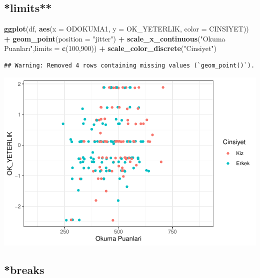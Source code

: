 \documentclass[
  oneside]{book}
\newenvironment{Shaded}{\begin{snugshade}}{\end{snugshade}}
\newcommand{\AttributeTok}[1]{\textcolor[rgb]{0.13,0.29,0.53}{#1}}
\newcommand{\DecValTok}[1]{\textcolor[rgb]{0.00,0.00,0.81}{#1}}
\newcommand{\FunctionTok}[1]{\textcolor[rgb]{0.13,0.29,0.53}{\textbf{#1}}}
\newcommand{\NormalTok}[1]{#1}
\newcommand{\SpecialCharTok}[1]{\textcolor[rgb]{0.81,0.36,0.00}{\textbf{#1}}}
\newcommand{\StringTok}[1]{\textcolor[rgb]{0.31,0.60,0.02}{#1}}
\begin{document}
\hypertarget{limits}{%
\subsection{*limits**}\label{limits}}

\begin{Shaded}
\begin{Highlighting}[]
\FunctionTok{ggplot}\NormalTok{(df, }\FunctionTok{aes}\NormalTok{(}\AttributeTok{x =}\NormalTok{ ODOKUMA1,}
\AttributeTok{y =}\NormalTok{ OK\_YETERLIK,}
\AttributeTok{color =}\NormalTok{ CINSIYET)) }\SpecialCharTok{+}
\FunctionTok{geom\_point}\NormalTok{(}\AttributeTok{position =} \StringTok{"jitter"}\NormalTok{) }\SpecialCharTok{+}
\FunctionTok{scale\_x\_continuous}\NormalTok{(}\StringTok{"Okuma Puanları"}\NormalTok{,}\AttributeTok{limits =} \FunctionTok{c}\NormalTok{(}\DecValTok{100}\NormalTok{,}\DecValTok{900}\NormalTok{)) }\SpecialCharTok{+}
\FunctionTok{scale\_color\_discrete}\NormalTok{(}\StringTok{"Cinsiyet"}\NormalTok{)}
\end{Highlighting}
\end{Shaded}

\begin{verbatim}
## Warning: Removed 4 rows containing missing values (`geom_point()`).
\end{verbatim}

\begin{center}\includegraphics[width=1\linewidth]{15-betimleyici-istatistik_files/figure-latex/unnamed-chunk-52-1} \end{center}

\hypertarget{breaks}{%
\subsection{*breaks}\label{breaks}}
\end{document}
